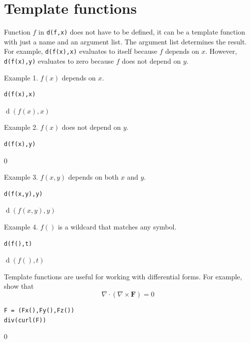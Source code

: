 
\newpage

\section{Template functions}

Function $f$ in \verb$d(f,x)$ does not have to be defined,
it can be a template function with just a name and an argument list.
The argument list determines the result.
For example, \verb$d(f(x),x)$ evaluates to itself because $f$ depends on $x$.
However, \verb$d(f(x),y)$ evaluates to zero because $f$ does not depend on $y$.

\bigskip
Example 1. $f(x)$ depends on $x$.

{\color{blue}
\begin{verbatim}
d(f(x),x)
\end{verbatim}}

$\operatorname{d}(f(x),x)$

\bigskip
Example 2. $f(x)$ does not depend on $y$.

{\color{blue}
\begin{verbatim}
d(f(x),y)
\end{verbatim}}

$0$

\bigskip
Example 3. $f(x,y)$ depends on both $x$ and $y$.

{\color{blue}
\begin{verbatim}
d(f(x,y),y)
\end{verbatim}}

$\operatorname{d}(f(x,y),y)$

\bigskip
Example 4. $f()$ is a wildcard that matches any symbol.

{\color{blue}
\begin{verbatim}
d(f(),t)
\end{verbatim}}

$\operatorname{d}(f(),t)$

\bigskip
Template functions are useful for working with differential forms.
For example, show that
\begin{equation*}
\nabla\cdot(\nabla\times\mathbf F)=0
\end{equation*}

{\color{blue}
\begin{verbatim}
F = (Fx(),Fy(),Fz())
div(curl(F))
\end{verbatim}}

$0$


